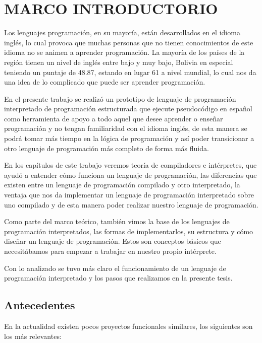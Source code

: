 \chapter{MARCO INTRODUCTORIO}
Los lenguajes programación, en su mayoría, están desarrollados en el idioma inglés, lo cual provoca que muchas personas que no tienen conocimientos de este idioma no se animen a aprender programación. La mayoría de los países de la región tienen un nivel de inglés entre bajo y muy bajo, Bolivia en especial teniendo un puntaje de 48.87, estando en lugar 61 a nivel mundial, lo cual nos da una idea de lo complicado que puede ser aprender programación. \parencite{ElDeber2018}

En el presente trabajo se realizó un prototipo de lenguaje de programación interpretado de programación estructurada que ejecute pseudocódigo en español como herramienta de apoyo a todo aquel que desee aprender o enseñar programación y no tengan familiaridad con el idioma inglés, de esta manera se podrá tomar más tiempo en la lógica de programación y así poder transicionar a otro lenguaje de programación más completo de forma más fluida.

En los capítulos de este trabajo veremos teoría de compiladores e intérpretes, que ayudó a entender cómo funciona un lenguaje de programación, las diferencias que existen entre un lenguaje de programación compilado y otro interpretado, la ventaja que nos da implementar un lenguaje de programación interpretado sobre uno compilado y de esta manera poder realizar nuestro lenguaje de programación.

Como parte del marco teórico, también vimos la base de los lenguajes de programación interpretados, las formas de implementarlos, su estructura y cómo diseñar un lenguaje de programación. Estos son conceptos básicos que necesitábamos para empezar a trabajar en nuestro propio intérprete.

Con lo analizado se tuvo más claro el funcionamiento de un lenguaje de programación interpretado y los pasos que realizamos en la presente tesis.

\section{Antecedentes}

En la actualidad existen pocos proyectos funcionales similares, los siguientes son los más relevantes:

